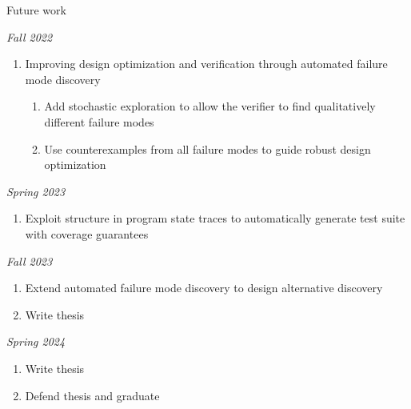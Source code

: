Future work

\textit{Fall 2022}
\begin{enumerate}
    \item Improving design optimization and verification through automated failure mode discovery
    \begin{enumerate}
        \item Add stochastic exploration to allow the verifier to find qualitatively different failure modes
        \item Use counterexamples from all failure modes to guide robust design optimization
    \end{enumerate}
\end{enumerate}

\textit{Spring 2023}
\begin{enumerate}
    \item Exploit structure in program state traces to automatically generate test suite with coverage guarantees
\end{enumerate}

\textit{Fall 2023}
\begin{enumerate}
    \item Extend automated failure mode discovery to design alternative discovery
    \item Write thesis
\end{enumerate}

\textit{Spring 2024}
\begin{enumerate}
    \item Write thesis
    \item Defend thesis and graduate
\end{enumerate}
